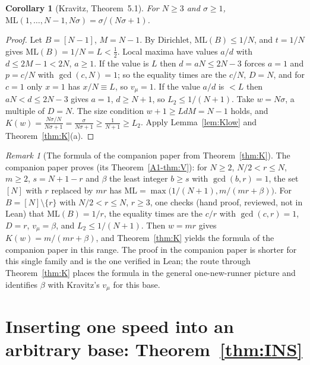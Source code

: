 \documentclass[11pt]{article}
\newtheorem{corollary}[theorem]{Corollary}
\theoremstyle{definition}
\theoremstyle{remark}
\newtheorem{remark}[theorem]{Remark}
\newcommand{\ML}{\mathrm{ML}}
\newcommand{\xA}[1]{\ref{A1-#1}}
\begin{document}
\begin{corollary}[Kravitz, Theorem~5.1]\label{cor:K51}
For $N\ge3$ and $\sigma\ge1$, $\ML(1,\dots,N-1,N\sigma)=\sigma/(N\sigma+1)$.
\end{corollary}
\begin{proof}
Let $B=[N-1]$, $M=N-1$. By Dirichlet, $\ML(B)\le1/N$, and $t=1/N$ gives $\ML(B)=1/N=L<\frac12$. Local maxima have values $a/d$ with $d\le2M-1<2N$, $a\ge1$. If the value is $L$ then $d=aN\le2N-3$ forces $a=1$ and $p=c/N$ with $\gcd(c,N)=1$; so the equality times are the $c/N$, $D=N$, and for $c=1$ only $x=1$ has $x/N\equiv L$, so $v_\mu=1$. If the value $a/d$ is $<L$ then $aN<d\le2N-3$ gives $a=1$, $d\ge N+1$, so $L_2\le1/(N+1)$. Take $w=N\sigma$, a multiple of $D=N$. The size condition $w+1\ge LdM=N-1$ holds, and $K(w)=\frac{N\sigma/N}{N\sigma+1}=\frac\sigma{N\sigma+1}\ge\frac1{N+1}\ge L_2$. Apply Lemma~\ref{lem:Klow} and Theorem~\ref{thm:K}(a).
\end{proof}

\begin{remark}[The formula of the companion paper from Theorem~\ref{thm:K}]\label{rem:KV}
The companion paper proves (its Theorem~\xA{thm:V}): for $N\ge2$, $N/2<r\le N$, $m\ge2$, $s=N+1-r$ and $\beta$ the least integer $b\ge s$ with $\gcd(b,r)=1$, the set $[N]$ with $r$ replaced by $mr$ has $\ML=\max\bigl(1/(N+1),m/(mr+\beta)\bigr)$. For $B=[N]\setminus\{r\}$ with $N/2<r\le N$, $r\ge3$, one checks (hand proof, reviewed, not in Lean) that $\ML(B)=1/r$, the equality times are the $c/r$ with $\gcd(c,r)=1$, $D=r$, $v_\mu=\beta$, and $L_2\le1/(N+1)$. Then $w=mr$ gives $K(w)=m/(mr+\beta)$, and Theorem~\ref{thm:K} yields the formula of the companion paper in this range. The proof in the companion paper is shorter for this single family and is the one verified in Lean; the route through Theorem~\ref{thm:K} places the formula in the general one-new-runner picture and identifies $\beta$ with Kravitz's $v_\mu$ for this base.
\end{remark}


\section{Inserting one speed into an arbitrary base: Theorem~\ref{thm:INS}}\label{sec:INS}
\end{document}
